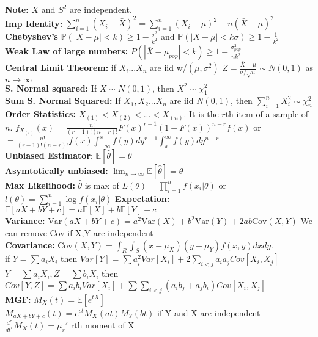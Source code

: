 \documentclass[a4paper,answers,12pt,addpoints]{exam}
\begin{document}
\textbf{Note:} $\bar{X}$ and $S^2$ are independent.\\
\textbf{Imp Identity:} $\sum_{i=1}^n (X_i - \bar{X})^2 = \sum_{i=1}^n (X_i - \mu)^2 - n(\bar{X} - \mu)^2$\\
\textbf{Chebyshev's} $\mathbb{P}(|X-\mu|< k) \geq 1 - \frac{\sigma^2}{k^2}$ and $\mathbb{P}(|X-\mu|< k\sigma) \geq 1 - \frac{1}{k^2}$ \\
\textbf{Weak Law of large numbers:} $P(|\bar{X} - \mu_{pop}| < k ) \geq 1 -\frac{\sigma^2_{pop}}{nk^2} $\\
\textbf{Central Limit Theorem:} if $X_i ... X_n$ are iid w/$(\mu, \sigma^2)$ $Z = \frac{\bar{X} - \mu}{\sigma/\sqrt{n}} \sim N(0,1)$ as $n \to \infty$\\
\textbf{S. Normal squared:} If $X \sim N(0,1)$, then $X^2 \sim \chi^2_1$\\
\textbf{Sum S. Normal Squared:} If $X_1, X_2 ... X_n$ are iid $N(0,1)$, then $\sum_{i=1}^n X_i^2 \sim \chi^2_n$\\
\textbf{Order Statistics:} $X_{(1)} < X_{(2)} < ... < X_{(n)}$. It is the $r$th item of a sample of $n$. $f_{X_{(r)}}(x) = \frac{n!}{(r-1)!(n-r)!}F(x)^{r-1}(1-F(x))^{n-r}f(x)$ or $= \frac{n!}{(r-1)!(n-r)!}f(x)\int_{-\infty}^x f(y)dy^{r-1}\int_x^\infty f(y)dy^{n-r}$\\
\textbf{Unbiased Estimator}: $\mathbb{E}[\hat{\theta}] = \theta$\\
\textbf{Asymtotically unbiased:} $\lim_{n\to\infty} \mathbb{E}[\hat{\theta}] = \theta$\\
\textbf{Max Likelihood:} $\hat{\theta}$ is max of $L(\theta) = \prod_{i=1}^n f(x_i|\theta)$ or $l(\theta) = \sum_{i=1}^n \log f(x_i|\theta)$
\textbf{Expectation:} $\mathbb{E}[aX+bY+c] = a\mathbb{E}[X] + b\mathbb{E}[Y] + c$\\
\textbf{Variance:} $\text{Var}(aX+bY+c) = a^2\text{Var}(X) + b^2\text{Var}(Y) + 2ab\text{Cov}(X,Y)$ We can remove Cov if X,Y are independent\\
\textbf{Covariance:} $\text{Cov}(X,Y) = \int_R \int_S (x-\mu_X)(y-\mu_Y)f(x,y)dxdy$.\\ if $Y = \sum a_i X_i$ then $Var[Y] = \sum a^2_i Var[X_i] + 2\sum_{i<j} a_ia_j Cov[X_i, X_j]$\\ 
$Y = \sum a_i X_i, Z = \sum b_i X_i$ then $Cov[Y,Z] = \sum a_ib_i Var[X_i] + \sum \sum_{i<j} (a_ib_j + a_jb_i) Cov[X_i, X_j]$\\
\textbf{MGF:} $M_X(t) = \mathbb{E}[e^{tX}]$\\
$M_{aX+bY+c}(t) = e^{ct}M_X(at)M_Y(bt)$ if Y and X are independent\\
$\frac{d^r}{dt^r} M_X(t) = \mu_r' $ rth moment of X\\ 
\end{document}
